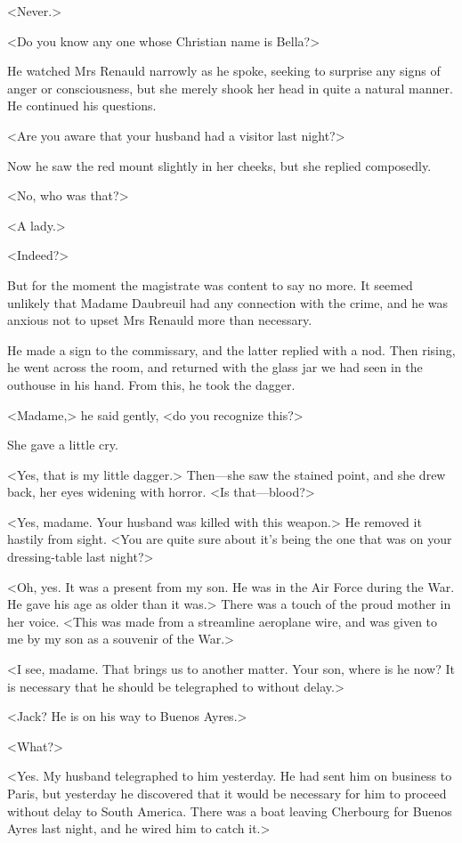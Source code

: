  <Never.> 

 <Do you know any one whose Christian name is Bella?> 

 He watched Mrs Renauld narrowly as he spoke, seeking to surprise any signs of anger or consciousness, but she merely shook her head in quite a natural manner. He continued his questions. 

 <Are you aware that your husband had a visitor last night?> 

 Now he saw the red mount slightly in her cheeks, but she replied composedly. 

 <No, who was that?> 

 <A lady.> 

 <Indeed?> 

 But for the moment the magistrate was content to say no more. It seemed unlikely that Madame Daubreuil had any connection with the crime, and he was anxious not to upset Mrs Renauld more than necessary. 

 He made a sign to the commissary, and the latter replied with a nod. Then rising, he went across the room, and returned with the glass jar we had seen in the outhouse in his hand. From this, he took the dagger. 

 <Madame,> he said gently, <do you recognize this?> 

 She gave a little cry. 

 <Yes, that is my little dagger.> Then—she saw the stained point, and she drew back, her eyes widening with horror. <Is that—blood?> 

 <Yes, madame. Your husband was killed with this weapon.> He removed it hastily from sight. <You are quite sure about it's being the one that was on your dressing-table last night?> 

 <Oh, yes. It was a present from my son. He was in the Air Force during the War. He gave his age as older than it was.> There was a touch of the proud mother in her voice. <This was made from a streamline aeroplane wire, and was given to me by my son as a souvenir of the War.> 

 <I see, madame. That brings us to another matter. Your son, where is he now? It is necessary that he should be telegraphed to without delay.> 

 <Jack? He is on his way to Buenos Ayres.> 

 <What?> 

 <Yes. My husband telegraphed to him yesterday. He had sent him on business to Paris, but yesterday he discovered that it would be necessary for him to proceed without delay to South America. There was a boat leaving Cherbourg for Buenos Ayres last night, and he wired him to catch it.> 

